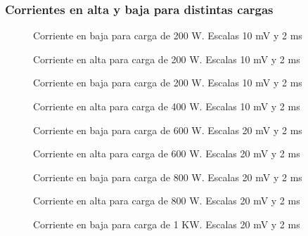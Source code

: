 \documentclass[11pt,letterpaper]{article}     %
\begin{document}
\subsubsection{Corrientes en alta y baja para distintas cargas}
\begin{figure}[H]
    \centering
    \caption{Corriente en baja para carga de 200 W. Escalas 10 mV y 2 ms}
    \label{shuntBaja200W}
\end{figure}
\begin{figure}[H]
    \centering
    \caption{Corriente en alta para carga de 200 W. Escalas 10 mV y 2 ms}
    \label{shuntAlta200W}
\end{figure}
\begin{figure}[H]
    \centering
    \caption{Corriente en baja para carga de 200 W. Escalas 10 mV y 2 ms}
    \label{shuntBaja400W}
\end{figure}
\begin{figure}[H]
    \centering
    \caption{Corriente en alta para carga de 400 W. Escalas 10 mV y 2 ms}
    \label{shuntAlta400W}
\end{figure}
\begin{figure}[H]
    \centering
    \caption{Corriente en baja para carga de 600 W. Escalas 20 mV y 2 ms}
    \label{shuntBaja600W}
\end{figure}
\begin{figure}[H]
    \centering
    \caption{Corriente en alta para carga de 600 W. Escalas 20 mV y 2 ms}
    \label{shuntAlta600W}
\end{figure}
\begin{figure}[H]
    \centering
    \caption{Corriente en baja para carga de 800 W. Escalas 20 mV y 2 ms}
    \label{shuntBaja800W}
\end{figure}
\begin{figure}[H]
    \centering
    \caption{Corriente en alta para carga de 800 W. Escalas 20 mV y 2 ms}
    \label{shuntAlta800W}
\end{figure}
\begin{figure}[H]
    \centering
    \caption{Corriente en baja para carga de 1 KW. Escalas 20 mV y 2 ms}
    \label{shuntBaja1KW}
\end{figure}
\end{document}
